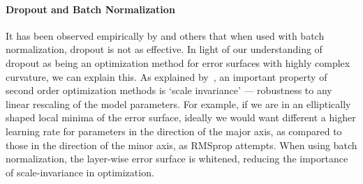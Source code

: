 \documentclass[thesis]{subfiles}
\begin{document}
\paragraph{Dropout and Batch Normalization}
It has been observed empirically by \citet{Ioffe2015} and others that when used with batch normalization, dropout is not as effective. In light of our understanding of dropout as being an optimization method for error surfaces with highly complex curvature, we can explain this. As explained by~\citep{martens2010deep}, an important property of second order optimization methods is `scale invariance' --- robustness to any linear rescaling of the model parameters. For example, if we are in an elliptically shaped local minima of the error surface, ideally we would want different a higher learning rate for parameters in the direction of the major axis, as compared to those in the direction of the minor axis, as RMSprop attempts. When using batch normalization, the layer-wise error surface is whitened, reducing the importance of scale-invariance in optimization.
\end{document}
